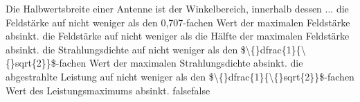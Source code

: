    {Die Halbwertsbreite einer Antenne ist der Winkelbereich, innerhalb dessen ...}
    {die Feldstärke auf nicht weniger als den 0,707-fachen Wert der maximalen Feldstärke absinkt.}
    {die Feldstärke auf nicht weniger als die Hälfte der maximalen Feldstärke absinkt.}
    {die Strahlungsdichte auf nicht weniger als den \$\textbackslash\{\}dfrac\{1\}\{\textbackslash\{\}sqrt\{2\}\}\$-fachen Wert der maximalen Strahlungsdichte absinkt.}
    {die abgestrahlte Leistung auf nicht weniger als den \$\textbackslash\{\}dfrac\{1\}\{\textbackslash\{\}sqrt\{2\}\}\$-fachen Wert des Leistungsmaximums absinkt.}
    {false}{false}